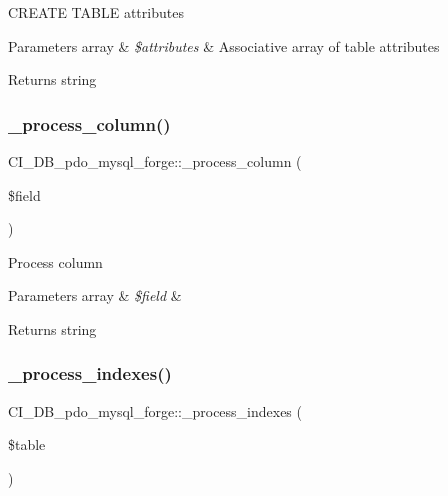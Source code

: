 C\+R\+E\+A\+TE T\+A\+B\+LE attributes


\begin{DoxyParams}[1]{Parameters}
array & {\em \$attributes} & Associative array of table attributes \\
\hline
\end{DoxyParams}
\begin{DoxyReturn}{Returns}
string 
\end{DoxyReturn}
\mbox{\label{class_c_i___d_b__pdo__mysql__forge_aca63347c0a9f8df78e344f293ad22b9d}} 
\subsubsection{\texorpdfstring{\+\_\+process\+\_\+column()}{\_process\_column()}}
{\footnotesize\ttfamily C\+I\+\_\+\+D\+B\+\_\+pdo\+\_\+mysql\+\_\+forge\+::\+\_\+process\+\_\+column (\begin{DoxyParamCaption}\item[{}]{\$field }\end{DoxyParamCaption})\hspace{0.3cm}{\ttfamily [protected]}}

Process column


\begin{DoxyParams}[1]{Parameters}
array & {\em \$field} & \\
\hline
\end{DoxyParams}
\begin{DoxyReturn}{Returns}
string 
\end{DoxyReturn}
\mbox{\label{class_c_i___d_b__pdo__mysql__forge_a547cffc8831bef6f3b15615afef6d6f2}} 
\subsubsection{\texorpdfstring{\+\_\+process\+\_\+indexes()}{\_process\_indexes()}}
{\footnotesize\ttfamily C\+I\+\_\+\+D\+B\+\_\+pdo\+\_\+mysql\+\_\+forge\+::\+\_\+process\+\_\+indexes (\begin{DoxyParamCaption}\item[{}]{\$table }\end{DoxyParamCaption})\hspace{0.3cm}{\ttfamily [protected]}}

